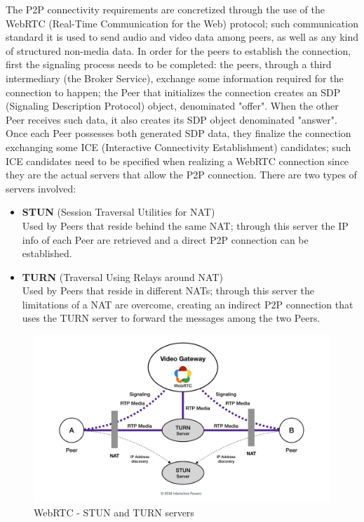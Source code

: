 The P2P connectivity requirements are concretized through the use of the WebRTC (Real-Time Communication for the Web) protocol; such communication standard it is used to send audio and video data among peers, as well as any kind of structured non-media data. In order for the peers to establish the connection, first the signaling process needs to be completed: the peers, through a third intermediary (the Broker Service), exchange some information required for the connection to happen; the Peer that initializes the connection creates an SDP (Signaling Description Protocol) object, denominated "offer". When the other Peer receives such data, it also creates its SDP object denominated "answer". Once each Peer possesses both generated SDP data, they finalize the connection exchanging some ICE (Interactive Connectivity Establishment) candidates; such ICE candidates need to be specified when realizing a WebRTC connection since they are the actual servers that allow the P2P connection. There are two types of servers involved:
\begin{itemize}
    \item \textbf{STUN} (Session Traversal Utilities for NAT)\\
    Used by Peers that reside behind the same NAT; through this server the IP info of each Peer are retrieved and a direct P2P connection can be established.
    \item \textbf{TURN} (Traversal Using Relays around NAT)\\
    Used by Peers that reside in different NATs; through this server the limitations of a NAT are overcome, creating an indirect P2P connection that uses the TURN server to forward the messages among the two Peers.
\end{itemize}

\begin{figure}[!ht]
    \centering
    \includegraphics[scale=0.15]{document/chapters/chapter_7/images/webrtc.jpeg}
    \caption{WebRTC - STUN and TURN servers \cite{stun_and_turn_servers}}
    \label{fig:webrtc}
\end{figure}

